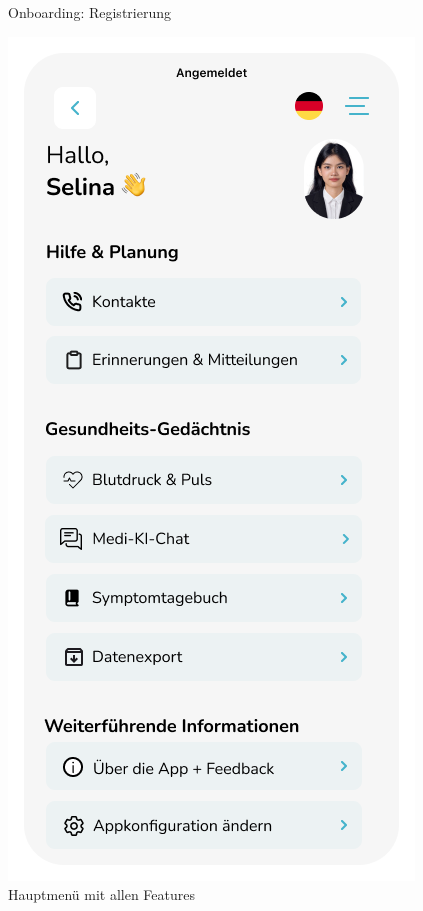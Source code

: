\begin{figure}[h!]
\begin{minipage}{0.3\linewidth}
		\caption{Onboarding: Registrierung}
		\label{fig:registrierung}
\end{minipage}
	\hfill
	\begin{minipage}{0.3\linewidth}
		\centering
		\includegraphics[width=\linewidth]{"images/Homescreen mit Symptomtagebuch"}
		\caption{Hauptmenü mit allen Features}
		\label{fig:homescreen-mit-symptomtagebuch}
	\end{minipage}%
\end{figure}

